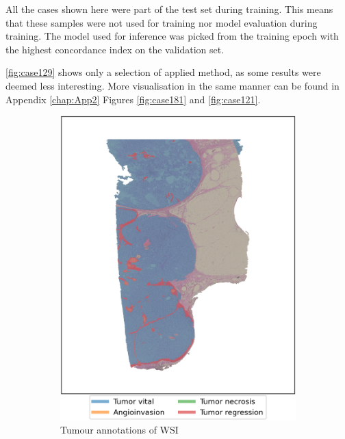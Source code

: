 All the cases shown here were part of the test set during training. This means that these samples were not used for training nor model evaluation during training. The model used for inference was picked from the training epoch with the highest concordance index on the validation set.

\ref{fig:case129} shows only a selection of applied method, as some results were deemed less interesting. More visualisation in the same manner can be found in Appendix \ref{chap:App2} Figures \ref{fig:case181} and \ref{fig:case121}.

\begin{figure}[h!t]
    \centering
     \begin{subfigure}[b]{0.475\textwidth}
         \centering
         \includegraphics[width=\textwidth]{latex/captum/case111/masks_case111-stain1-censored_3499days.png}
         \caption{Tumour annotations of WSI}
     \end{subfigure}
    \hfill
     \begin{subfigure}[b]{0.49\textwidth}

\end{subfigure}
\end{figure}
